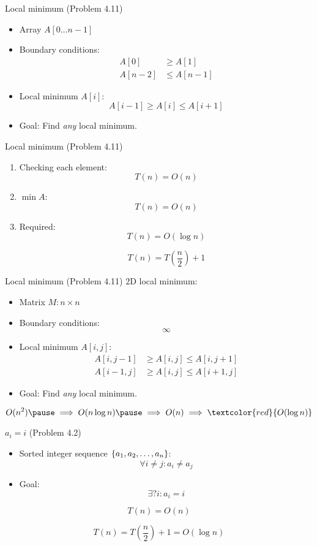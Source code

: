 \begin{frame}{Local minimum (Problem 4.11)}
  \begin{itemize}
	\item Array $A[0 \ldots n-1]$
	\item Boundary conditions:
	  \begin{align*}
		A[0] &\ge A[1] \\
		A[n-2] &\le A[n-1]
	  \end{align*}
	\item Local minimum $A[i]$:
	  \[
		A[i-1] \ge A[i] \le A[i+1]
	  \]
	\item Goal: Find \emph{any} local minimum.
  \end{itemize}
\end{frame}
\begin{frame}{Local minimum (Problem 4.11)}
  \begin{enumerate}
	\item Checking each element:
	  \[
		T(n) = O(n)
	  \]
	\item $\min A$:
	  \[
		T(n) = O(n)
	  \]
	\pause
	\item Required:
	  \[
		T(n) = O(\log n)
	  \]

	  \pause
	  \[
		T(n) = T(\frac{n}{2}) + 1
	  \]
  \end{enumerate}
\end{frame}
\begin{frame}{Local minimum (Problem 4.11)}
  2D local minimum:
  \begin{itemize}
	\item Matrix $M: n \times n$
	\item Boundary conditions:
	  \[
		\infty
	  \]
	\item Local minimum $A[i,j]$:
	  \begin{align*}
		A[i,j-1] &\ge A[i,j] \le A[i,j+1] \\
		A[i-1,j] &\ge A[i,j] \le A[i+1,j]
	  \end{align*}
	\item Goal: Find \emph{any} local minimum.
  \end{itemize}

  \pause
  \[
	O(n^2) \pause \implies O(n \log n) \pause \implies O(n) \implies \textcolor{red}{O(\log n)}
  \]
\end{frame}
\begin{frame}{$a_i = i$ (Problem 4.2)}
  \begin{itemize}
	\item Sorted integer sequence $\{a_1, a_2, \ldots, a_n\}$:
	  \[
		\forall i \neq j: a_i \neq a_j
	  \]
	\item Goal: 
	  \[
		\exists? i: a_i = i
	  \]
  \end{itemize}

  \pause
  \[
	T(n) = O(n)
  \]

  \pause
  \[
	T(n) = T(\frac{n}{2}) + 1 = O(\log n)
  \]
\end{frame}
